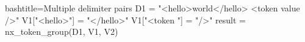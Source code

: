 
\begin{NexCodeBox}{bash}{title={Multiple delimiter pairs}}
	D1 = "<hello>world</hello> <token value />"
	V1["<hello>"] = "</hello>"
	V1["<token "] = "/>"
	result = nx_token_group(D1, V1, V2)
\end{NexCodeBox}
